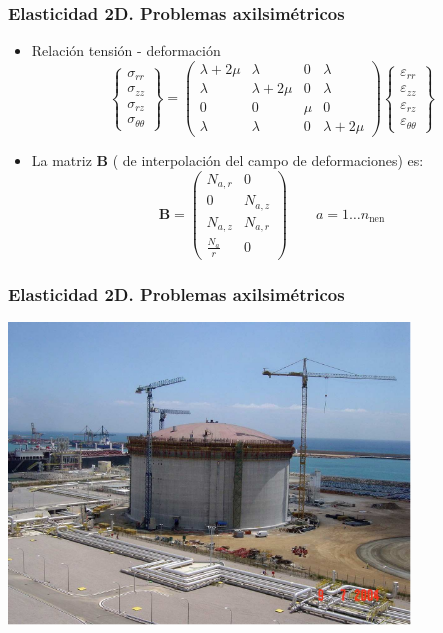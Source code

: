 \documentclass[handout]{beamer}
\begin{document}
\begin{frame}
\frametitle{Elasticidad 2D. Problemas axilsimétricos}
\begin{itemize}
\item Relación tensión - deformación
\begin{equation}
\left\{
\begin{array}{c}
\sigma_{rr} \\
\sigma_{zz} \\
\sigma_{rz} \\
\sigma_{\theta \theta}
\end{array}
\right\}=
\left(
\begin{array}{cccc}
\lambda+2\mu & \lambda     & 0 & \lambda \\
\lambda     & \lambda+2\mu & 0 & \lambda \\
0           & 0       & \mu& 0 \\
\lambda     & \lambda & 0 & \lambda+2\mu
\end{array}
\right)
\left\{
\begin{array}{c}
\varepsilon_{rr} \\
\varepsilon_{zz} \\
\varepsilon_{rz} \\
\varepsilon_{\theta \theta}
\end{array}
\right\}
\end{equation}
\item La matriz $\mathbf{B}$ ( de interpolación del campo de deformaciones)
es:
\begin{equation}
\mathbf{B}=
\left(
\begin{array}{cc}
N_{a,r} & 0       \\
0       & N_{a,z} \\
N_{a,z} & N_{a,r} \\
\frac{N_a}{r}&0
\end{array}
\right) \qquad a=1 \ldots n_{\textrm{nen}}
\end{equation}
\end{itemize}
\end{frame}
\begin{frame}
\frametitle{Elasticidad 2D. Problemas axilsimétricos}
\begin{center}
\includegraphics[width=0.8\textwidth]{tn_lng_tank2}
\end{center}
\end{frame}
\end{document}
